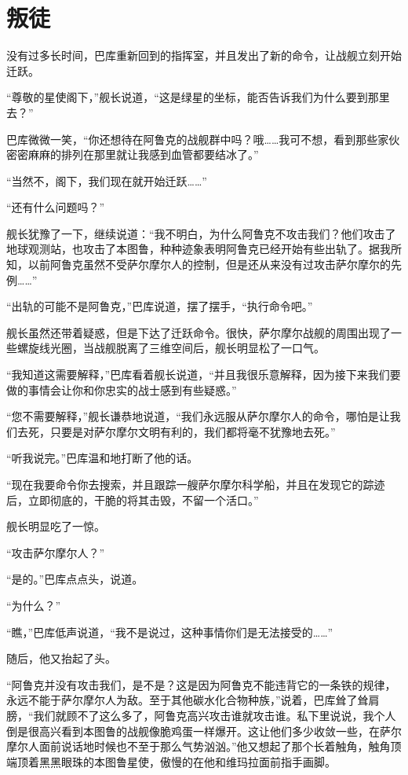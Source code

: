 \chapter{叛徒}

没有过多长时间，巴库重新回到的指挥室，并且发出了新的命令，让战舰立刻开始迁跃。 

“尊敬的星使阁下，”舰长说道，“这是绿星的坐标，能否告诉我们为什么要到那里去？” 

巴库微微一笑，“你还想待在阿鲁克的战舰群中吗？哦……我可不想，看到那些家伙密密麻麻的排列在那里就让我感到血管都要结冰了。” 

“当然不，阁下，我们现在就开始迁跃……” 

“还有什么问题吗？” 

舰长犹豫了一下，继续说道：“我不明白，为什么阿鲁克不攻击我们？他们攻击了地球观测站，也攻击了本图鲁，种种迹象表明阿鲁克已经开始有些出轨了。据我所知，以前阿鲁克虽然不受萨尔摩尔人的控制，但是还从来没有过攻击萨尔摩尔的先例……” 

“出轨的可能不是阿鲁克，”巴库说道，摆了摆手，“执行命令吧。” 

舰长虽然还带着疑惑，但是下达了迁跃命令。很快，萨尔摩尔战舰的周围出现了一些螺旋线光圈，当战舰脱离了三维空间后，舰长明显松了一口气。 

“我知道这需要解释，”巴库看着舰长说道，“并且我很乐意解释，因为接下来我们要做的事情会让你和你忠实的战士感到有些疑惑。” 

“您不需要解释，”舰长谦恭地说道，“我们永远服从萨尔摩尔人的命令，哪怕是让我们去死，只要是对萨尔摩尔文明有利的，我们都将毫不犹豫地去死。” 

“听我说完。”巴库温和地打断了他的话。 

“现在我要命令你去搜索，并且跟踪一艘萨尔摩尔科学船，并且在发现它的踪迹后，立即彻底的，干脆的将其击毁，不留一个活口。” 

舰长明显吃了一惊。 

“攻击萨尔摩尔人？” 

“是的。”巴库点点头，说道。 

“为什么？” 

“瞧，”巴库低声说道，“我不是说过，这种事情你们是无法接受的……” 

随后，他又抬起了头。 

“阿鲁克并没有攻击我们，是不是？这是因为阿鲁克不能违背它的一条铁的规律，永远不能于萨尔摩尔人为敌。至于其他碳水化合物种族，”说着，巴库耸了耸肩膀，“我们就顾不了这么多了，阿鲁克高兴攻击谁就攻击谁。私下里说说，我个人倒是很高兴看到本图鲁的战舰像脆鸡蛋一样爆开。这让他们多少收敛一些，在萨尔摩尔人面前说话地时候也不至于那么气势汹汹。”他又想起了那个长着触角，触角顶端顶着黑黑眼珠的本图鲁星使，傲慢的在他和维玛拉面前指手画脚。 

